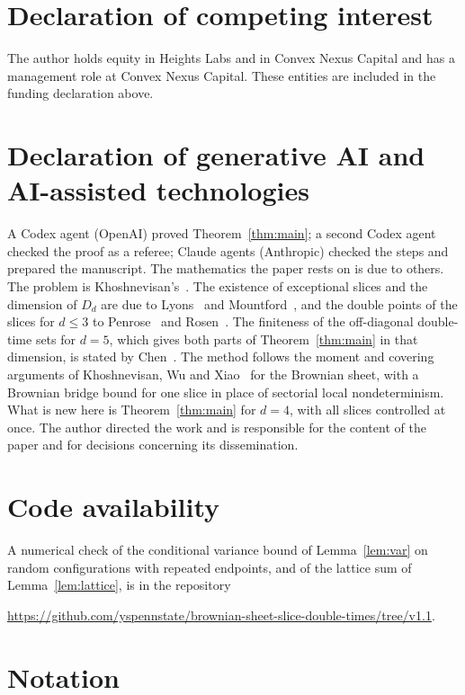 \documentclass[11pt]{amsart}
\theoremstyle{remark}
\begin{document}
\section*{Declaration of competing interest}
The author holds equity in Heights Labs and in Convex Nexus Capital and has a management role at Convex Nexus Capital.
These entities are included in the funding declaration above.

\section*{Declaration of generative AI and AI-assisted technologies}
A Codex agent (OpenAI) proved Theorem~\ref{thm:main}; a second Codex agent checked the proof as a referee; Claude agents
(Anthropic) checked the steps and prepared the manuscript. The mathematics the paper rests on is due to others. The
problem is Khoshnevisan's~\cite{Kho05}. The existence of exceptional slices and the dimension of $D_d$ are due to
Lyons~\cite{Lyo86} and Mountford~\cite{Mou90}, and the double points of the slices for $d\le3$ to
Penrose~\cite{Pen89,Pen90} and Rosen~\cite{Ros84}. The finiteness of the off-diagonal double-time sets for $d=5$,
which gives both parts of Theorem~\ref{thm:main} in that dimension, is stated by Chen~\cite{Che26}. The method follows
the moment and covering arguments of Khoshnevisan, Wu and Xiao~\cite{KWX06} for the Brownian sheet, with a Brownian
bridge bound for one slice in place of sectorial local nondeterminism. What is new here is Theorem~\ref{thm:main} for
$d=4$, with all slices controlled at once. The author directed the work and is responsible for the
content of the paper and for decisions concerning its dissemination.

\section*{Code availability}
A numerical check of the conditional variance bound of Lemma~\ref{lem:var} on random configurations with repeated
endpoints, and of the lattice sum of Lemma~\ref{lem:lattice}, is in the repository
\begin{center}\url{https://github.com/yspennstate/brownian-sheet-slice-double-times/tree/v1.1}.\end{center}

\appendix
\section{Notation}\label{app:notation}
\end{document}
